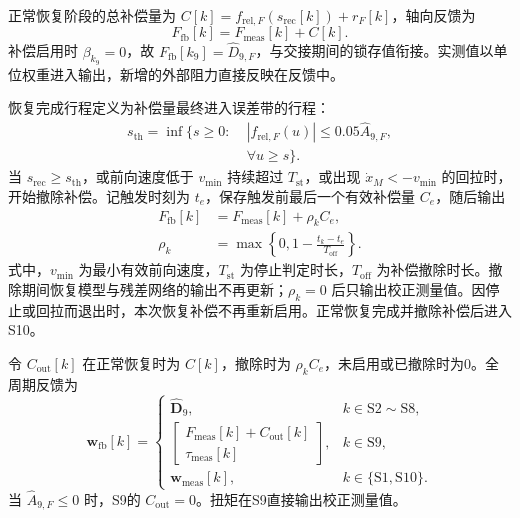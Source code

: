 \documentclass{JQRnew}
\begin{document}
正常恢复阶段的总补偿量为 $C[k]=f_{\mathrm{rel},F}(s_{\mathrm{rec}}[k])+r_F[k]$，轴向反馈为
\begin{equation}
\label{eq:active-output}
F_{\mathrm{fb}}[k]=F_{\mathrm{meas}}[k]+C[k].
\end{equation}
补偿启用时 $\beta_{k_9}=0$，故 $F_{\mathrm{fb}}[k_9]=\widehat D_{9,F}$，与交接期间的锁存值衔接。实测值以单位权重进入输出，新增的外部阻力直接反映在反馈中。

恢复完成行程定义为补偿量最终进入误差带的行程：
\begin{equation}
\label{eq:completion-travel}
\begin{aligned}
s_{\mathrm{th}}=\inf\big\{s\ge0:\;&|f_{\mathrm{rel},F}(u)|
\le0.05\widehat A_{9,F},\\
&\forall u\ge s\big\}.
\end{aligned}
\end{equation}
当 $s_{\mathrm{rec}}\ge s_{\mathrm{th}}$，或前向速度低于 $v_{\min}$ 持续超过 $T_{\mathrm{st}}$，或出现 $\dot x_M<-v_{\min}$ 的回拉时，开始撤除补偿。记触发时刻为 $t_e$，保存触发前最后一个有效补偿量 $C_e$，随后输出
\begin{equation}
\label{eq:withdrawal}
\begin{aligned}
F_{\mathrm{fb}}[k]&=F_{\mathrm{meas}}[k]+\rho_kC_e,\\
\rho_k&=\max\!\left\{0,1-\frac{t_k-t_e}{T_{\mathrm{off}}}\right\}.
\end{aligned}
\end{equation}
式中，$v_{\min}$ 为最小有效前向速度，$T_{\mathrm{st}}$ 为停止判定时长，$T_{\mathrm{off}}$ 为补偿撤除时长。撤除期间恢复模型与残差网络的输出不再更新；$\rho_k=0$ 后只输出校正测量值。因停止或回拉而退出时，本次恢复补偿不再重新启用。正常恢复完成并撤除补偿后进入S10。

令 $C_{\mathrm{out}}[k]$ 在正常恢复时为 $C[k]$，撤除时为 $\rho_kC_e$，未启用或已撤除时为0。全周期反馈为
\begin{equation}
\label{eq:phase-output}
\bm w_{\mathrm{fb}}[k]=
\begin{cases}
\widehat{\bm D}_9,&k\in\mathrm{S2}\sim\mathrm{S8},\\
\begin{bmatrix}F_{\mathrm{meas}}[k]+C_{\mathrm{out}}[k]\\
\tau_{\mathrm{meas}}[k]\end{bmatrix},&k\in\mathrm{S9},\\
\bm w_{\mathrm{meas}}[k],&k\in\{\mathrm{S1},\mathrm{S10}\}.
\end{cases}
\end{equation}
当 $\widehat A_{9,F}\le0$ 时，S9的 $C_{\mathrm{out}}=0$。扭矩在S9直接输出校正测量值。
\end{document}
